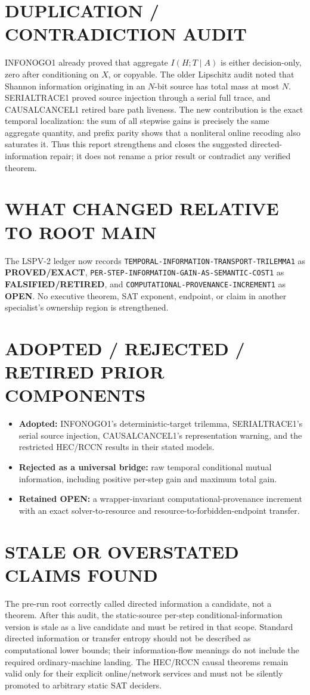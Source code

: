 \documentclass[11pt]{article}
\newcommand{\EXACT}{\textbf{PROVED/EXACT}}
\newcommand{\OPEN}{\textbf{OPEN}}
\newcommand{\RETIRED}{\textbf{FALSIFIED/RETIRED}}
\newcommand{\claim}[1]{\texttt{#1}}
\begin{document}
\section{DUPLICATION / CONTRADICTION AUDIT}
INFONOGO1 already proved that aggregate $I(H;T\mid A)$ is either decision-only,
zero after conditioning on $X$, or copyable.  The older Lipschitz audit noted
that Shannon information originating in an $N$-bit source has total mass at
most $N$.  SERIALTRACE1 proved source injection through a serial full trace,
and CAUSALCANCEL1 retired bare path liveness.  The new contribution is the
exact temporal localization: the sum of all stepwise gains is precisely the
same aggregate quantity, and prefix parity shows that a nonliteral online
recoding also saturates it.  Thus this report strengthens and closes the
suggested directed-information repair; it does not rename a prior result or
contradict any verified theorem.

\section{WHAT CHANGED RELATIVE TO ROOT MAIN}
The LSPV-2 ledger now records
\claim{TEMPORAL-INFORMATION-TRANSPORT-TRILEMMA1} as \EXACT,
\claim{PER-STEP-INFORMATION-GAIN-AS-SEMANTIC-COST1} as \RETIRED, and
\claim{COMPUTATIONAL-PROVENANCE-INCREMENT1} as \OPEN.  No executive theorem,
SAT exponent, endpoint, or claim in another specialist's ownership region is
strengthened.

\section{ADOPTED / REJECTED / RETIRED PRIOR COMPONENTS}
\begin{itemize}[leftmargin=*]
\item \textbf{Adopted:} INFONOGO1's deterministic-target trilemma,
SERIALTRACE1's serial source injection, CAUSALCANCEL1's representation warning,
and the restricted HEC/RCCN results in their stated models.
\item \textbf{Rejected as a universal bridge:} raw temporal conditional
mutual information, including positive per-step gain and maximum total gain.
\item \textbf{Retained \OPEN:} a wrapper-invariant computational-provenance
increment with an exact solver-to-resource and resource-to-forbidden-endpoint
transfer.
\end{itemize}

\section{STALE OR OVERSTATED CLAIMS FOUND}
The pre-run root correctly called directed information a candidate, not a
theorem.  After this audit, the static-source per-step conditional-information
version is stale as a live candidate and must be retired in that scope.
Standard directed information or transfer entropy should not be described as
computational lower bounds; their information-flow meanings do not include the
required ordinary-machine landing.  The HEC/RCCN causal theorems remain valid
only for their explicit online/network services and must not be silently
promoted to arbitrary static SAT deciders.
\end{document}
